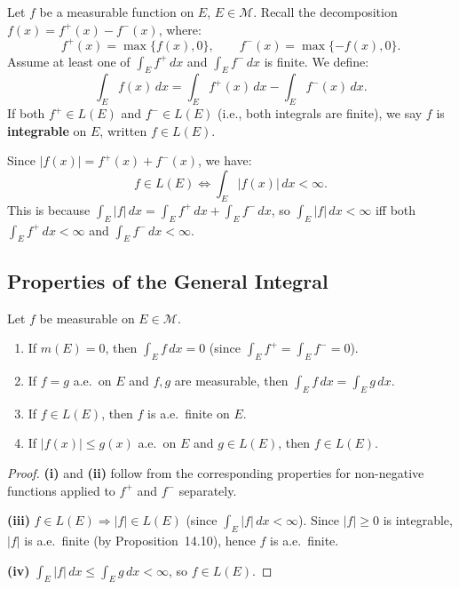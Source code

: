 \documentclass[11pt]{report}
\begin{document}
\begin{defbox}
Let $f$ be a measurable function on $E$, $E \in \mathcal{M}$. Recall the decomposition $f(x) = f^+(x) - f^-(x)$, where:
\[
f^+(x) = \max\{f(x), 0\}, \qquad f^-(x) = \max\{-f(x), 0\}.
\]
Assume at least one of $\int_E f^+\,dx$ and $\int_E f^-\,dx$ is finite. We define:
\[
\int_E f(x)\,dx = \int_E f^+(x)\,dx - \int_E f^-(x)\,dx.
\]
If both $f^+ \in L(E)$ and $f^- \in L(E)$ (i.e., both integrals are finite), we say $f$ is \textbf{integrable} on $E$, written $f \in L(E)$.
\end{defbox}

\begin{rembox}
Since $|f(x)| = f^+(x) + f^-(x)$, we have:
\[
f \in L(E) \iff \int_E |f(x)|\,dx < \infty.
\]
This is because $\int_E |f|\,dx = \int_E f^+\,dx + \int_E f^-\,dx$, so $\int_E |f|\,dx < \infty$ iff both $\int_E f^+\,dx < \infty$ and $\int_E f^-\,dx < \infty$.
\end{rembox}

\subsection{Properties of the General Integral}

\begin{propbox}
Let $f$ be measurable on $E \in \mathcal{M}$.
\begin{enumerate}[label=(\roman*)]
\item If $m(E) = 0$, then $\int_E f\,dx = 0$ (since $\int_E f^+ = \int_E f^- = 0$).
\item If $f = g$ a.e.\ on $E$ and $f, g$ are measurable, then $\int_E f\,dx = \int_E g\,dx$.
\item If $f \in L(E)$, then $f$ is a.e.\ finite on $E$.
\item If $|f(x)| \leq g(x)$ a.e.\ on $E$ and $g \in L(E)$, then $f \in L(E)$.
\end{enumerate}
\end{propbox}

\begin{proof}
\textbf{(i)} and \textbf{(ii)} follow from the corresponding properties for non-negative functions applied to $f^+$ and $f^-$ separately.

\textbf{(iii)} $f \in L(E) \Rightarrow |f| \in L(E)$ (since $\int_E |f|\,dx < \infty$). Since $|f| \geq 0$ is integrable, $|f|$ is a.e.\ finite (by Proposition~14.10), hence $f$ is a.e.\ finite.

\textbf{(iv)} $\int_E |f|\,dx \leq \int_E g\,dx < \infty$, so $f \in L(E)$.
\end{proof}
\end{document}
